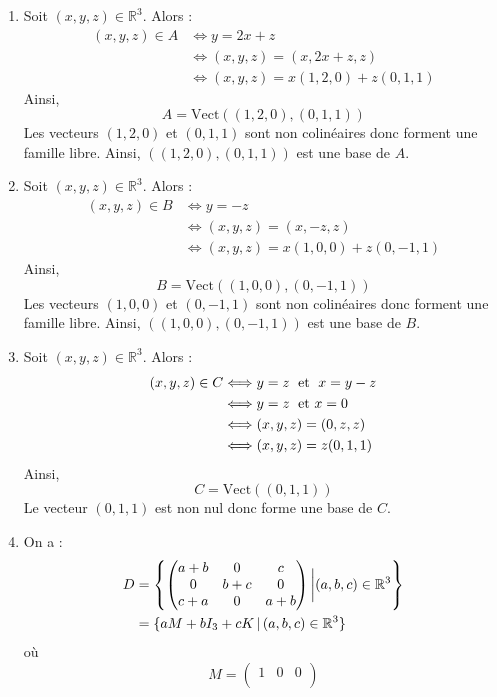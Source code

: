 \documentclass[a4paper,10pt]{report}
\begin{document}
\begin{enumerate}
\item Soit $(x,y,z) \in \mathbb{R}^3$. Alors :
\begin{align*}
(x,y,z) \in A& \Longleftrightarrow y=2x+z \\
& \Longleftrightarrow (x,y,z)=(x,2x+z,z) \\
& \Longleftrightarrow (x,y,z) = x (1,2,0) + z(0,1,1)
\end{align*}
Ainsi,
$$ A = \textrm{Vect}((1,2,0),(0,1,1))$$
Les vecteurs $(1,2,0)$ et $(0,1,1)$ sont non colinéaires donc forment une famille libre. Ainsi, $((1,2,0),(0,1,1))$ est une base de $A$.

\item Soit $(x,y,z) \in \mathbb{R}^3$. Alors :
\begin{align*}
(x,y,z) \in B&\Longleftrightarrow y=-z \\
& \Longleftrightarrow (x,y,z)=(x,-z,z) \\
& \Longleftrightarrow (x,y,z) = x (1,0,0) + z (0,-1,1) 
\end{align*}
Ainsi,
$$ B = \textrm{Vect}((1,0,0),(0,-1,1))$$
Les vecteurs $(1,0,0)$ et $(0,-1,1)$ sont non colinéaires donc forment une famille libre. Ainsi, $((1,0,0),(0,-1,1))$ est une base de $B$.
\item Soit $(x,y,z) \in \mathbb{R}^3$. Alors :
\begin{align*}
(x,y,z) \in C&\Longleftrightarrow y=z \; \hbox{ et } \; x=y-z \\
& \Longleftrightarrow y=z \; \hbox{ et }  x=0 \\
& \Longleftrightarrow (x,y,z)= (0,z,z) \\
& \Longleftrightarrow (x,y,z)= z (0,1,1)
\end{align*}
Ainsi,
$$C = \textrm{Vect}((0,1,1))$$
Le vecteur $(0,1,1)$ est non nul donc forme une base de $C$.
\item On a :
\begin{align*}
D & = \left\lbrace \begin{pmatrix}
a+b & 0 & c \\
0 & b+c & 0 \\
c+a & 0& a+b 
\end{pmatrix} \bigg{\vert} (a,b,c) \in \mathbb{R}^3 \right\rbrace \\
& = \lbrace a M + b I_3 + c K \,\vert \, (a,b,c) \in \mathbb{R}^3 \rbrace 
\end{align*}
où 
$$ M = \begin{pmatrix}
1 & 0 & 0 \\

\end{pmatrix}$$
\end{enumerate}
\end{document}
